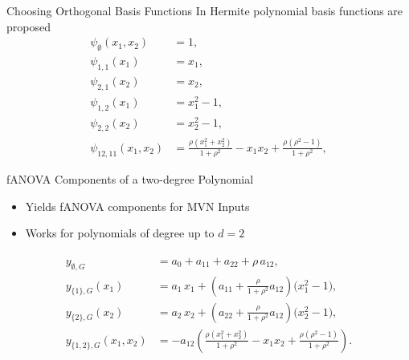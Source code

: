 \begin{frame}{Choosing Orthogonal Basis Functions}
  In \cite{rahman2014} Hermite polynomial basis functions are proposed
  \begin{align*}
    \psi_{\emptyset}(x_1,x_2) &= 1, \\[0.5em]
\psi_{1,1}(x_1) &= x_1, \\[0.5em]
\psi_{2,1}(x_2) &= x_2, \\[0.5em]
\psi_{1,2}(x_1) &= x_1^2 - 1, \\[0.5em]
\psi_{2,2}(x_2) &= x_2^2 - 1, \\[0.5em]
\psi_{12,11}(x_1,x_2) &= \frac{\rho (x_1^2 + x_2^2)}{1 + \rho^2} 
                         - x_1 x_2 
                         + \frac{\rho(\rho^2 - 1)}{1 + \rho^2},
\end{align*}
\end{frame}


\begin{frame}{fANOVA Components of a two-degree Polynomial}
  \begin{itemize}
    \item Yields fANOVA components for MVN Inputs
    \item Works for polynomials of degree up to $d = 2$
  \end{itemize}
  \begin{align*}
\begin{split}
y_{\emptyset, G} &= a_0 + a_{11} + a_{22} + \rho\,a_{12}, \\[0.5em]
y_{\{1\}, G}(x_1) &= a_1\,x_1 
  + \left(a_{11} + \frac{\rho}{1+\rho^2}a_{12}\right)\bigl(x_1^2 - 1\bigr), \\[0.5em]
y_{\{2\}, G}(x_2) &= a_2\,x_2 
  + \left(a_{22} + \frac{\rho}{1+\rho^2}a_{12}\right)\bigl(x_2^2 - 1\bigr), \\[0.5em]
y_{\{1,2\}, G}(x_1,x_2) 
&= -a_{12}\!\left(
    \frac{\rho(x_1^2+x_2^2)}{1+\rho^2} 
    - x_1 x_2 
    + \frac{\rho(\rho^2-1)}{1+\rho^2}
   \right).
\end{split}
\end{align*}
\end{frame}
  

